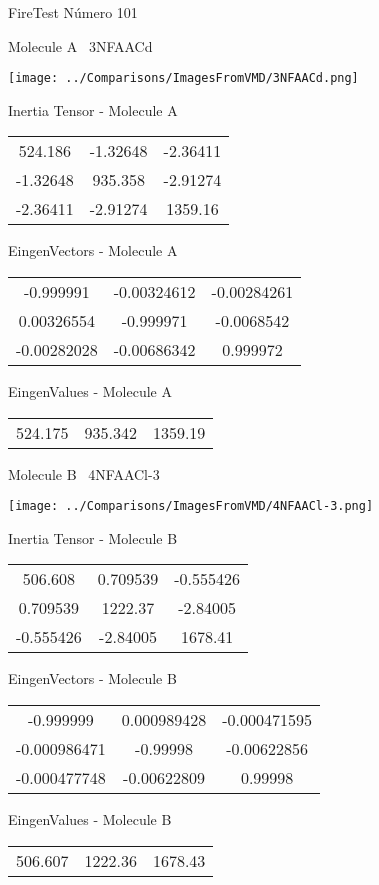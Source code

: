\vtab[-3cm]
\begin{center}
{\large FireTest \tab Número 101}
\end{center}
\begin{multicols}{2}
\begin{center}

Molecule A \
3NFAACd

\texttt{[image: ../Comparisons/ImagesFromVMD/3NFAACd.png]}

Inertia Tensor - Molecule A \\
\begin{tabular}{|c c c|}
524.186	 & 	-1.32648	 & 	-2.36411	 \\
-1.32648	 & 	935.358	 & 	-2.91274	 \\
-2.36411	 & 	-2.91274	 & 	1359.16
\end{tabular}

\vtab
 EingenVectors - Molecule A     \\
\begin{tabular}{|c c c|}
-0.999991	 & 	-0.00324612	 & 	-0.00284261	 \\
0.00326554	 & 	-0.999971	 & 	-0.0068542	 \\
-0.00282028	 & 	-0.00686342	 & 	0.999972
\end{tabular}

\vtab
 EingenValues - Molecule A     \\
\begin{tabular}{|c c c|}
524.175	 & 	935.342	 & 	1359.19	 \\
\end{tabular}
\columnbreak

Molecule B \
4NFAACl-3

\texttt{[image: ../Comparisons/ImagesFromVMD/4NFAACl-3.png]}

Inertia Tensor - Molecule B \\
\begin{tabular}{|c c c|}
506.608	 & 	0.709539	 & 	-0.555426	 \\
0.709539	 & 	1222.37	 & 	-2.84005	 \\
-0.555426	 & 	-2.84005	 & 	1678.41
\end{tabular}

\vtab
 EingenVectors - Molecule B     \\
\begin{tabular}{|c c c|}
-0.999999	 & 	0.000989428	 & 	-0.000471595	 \\
-0.000986471	 & 	-0.99998	 & 	-0.00622856	 \\
-0.000477748	 & 	-0.00622809	 & 	0.99998
\end{tabular}

\vtab
 EingenValues - Molecule B     \\
\begin{tabular}{|c c c|}
506.607	 & 	1222.36	 & 	1678.43	 \\
\end{tabular}

\end{center}
\end{multicols}

